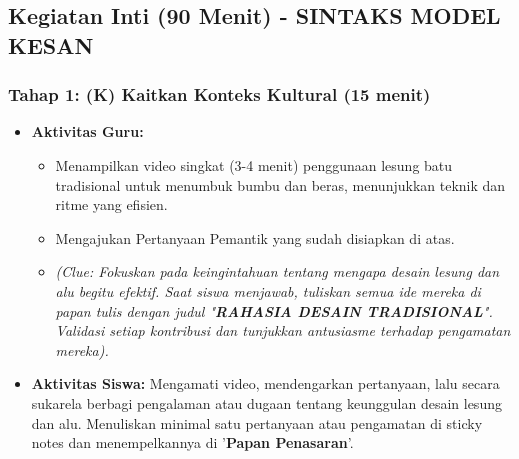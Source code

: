 \documentclass[a4paper,12pt]{article}
\begin{document}
\subsection{Kegiatan Inti (90 Menit) - SINTAKS MODEL KESAN}

\subsubsection{Tahap 1: (K) Kaitkan Konteks Kultural (15 menit)}
\begin{itemize}
\item \textbf{Aktivitas Guru:}
    \begin{itemize}
    \item Menampilkan video singkat (3-4 menit) penggunaan lesung batu tradisional untuk menumbuk bumbu dan beras, menunjukkan teknik dan ritme yang efisien.
    \item Mengajukan Pertanyaan Pemantik yang sudah disiapkan di atas.
    \item \textit{(Clue: Fokuskan pada keingintahuan tentang mengapa desain lesung dan alu begitu efektif. Saat siswa menjawab, tuliskan semua ide mereka di papan tulis dengan judul "\textbf{RAHASIA DESAIN TRADISIONAL}". Validasi setiap kontribusi dan tunjukkan antusiasme terhadap pengamatan mereka).}
    \end{itemize}
\item \textbf{Aktivitas Siswa:} Mengamati video, mendengarkan pertanyaan, lalu secara sukarela berbagi pengalaman atau dugaan tentang keunggulan desain lesung dan alu. Menuliskan minimal satu pertanyaan atau pengamatan di sticky notes dan menempelkannya di '\textbf{Papan Penasaran}'.
\end{itemize}
\end{document}
